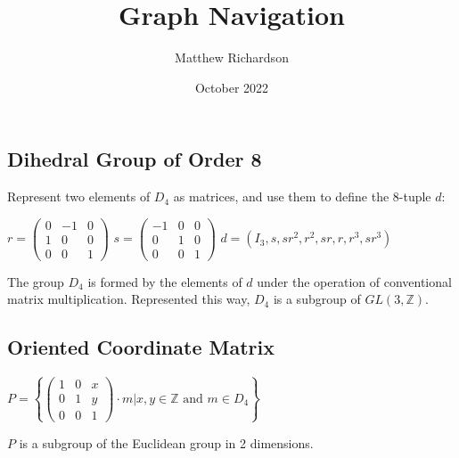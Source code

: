 \documentclass[12pt]{article}
\title{Graph Navigation}
\author{Matthew Richardson}
\date{October 2022}
\begin{document}
\subsection*{Dihedral Group of Order 8}
Represent two elements of $D_4$ as matrices, and use them to define the 8-tuple $d$:
\begin{center}
    $r=\begin{pmatrix} 0 & -1 & 0 \\ 1 & 0 & 0 \\ 0 & 0 & 1 \end{pmatrix}$
    \quad
    $s=\begin{pmatrix} -1 & 0 & 0 \\ 0 & 1 & 0 \\ 0 & 0 & 1 \end{pmatrix}$
    \quad\quad
    $d=(I_3,s,sr^2,r^2,sr,r,r^3,sr^3)$
\end{center}
The group $D_4$ is formed by the elements of $d$ under the operation of conventional matrix multiplication. Represented this way, $D_4$ is a subgroup of $GL(3,\mathbb{Z})$.
\subsection*{Oriented Coordinate Matrix}
\begin{center}
    $P=\left\{\begin{pmatrix}
        1 & 0 & x \\
        0 & 1 & y \\
        0 & 0 & 1 \end{pmatrix}\cdot m\mathrel{\bigg|} x,y\in\mathbb{Z}\text{ and }m\in D_4\right\}$
\end{center}
$P$ is a subgroup of the Euclidean group in 2 dimensions.
\end{document}
